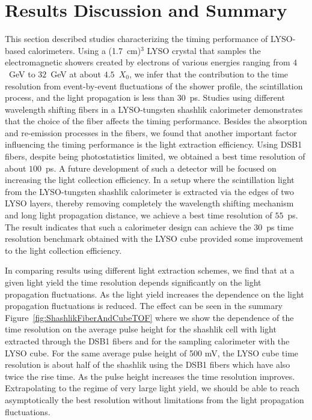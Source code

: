 \section{Results Discussion and Summary }
This section described studies characterizing the timing performance
of LYSO-based calorimeters. Using a (1.7~cm)$^{3}$ LYSO crystal that
samples the electromagnetic showers created by electrons of various energies
ranging from $4$~GeV to $32$~GeV at about $4.5$~$X_{0}$, we infer that the
contribution to the time resolution from event-by-event fluctuations of the
shower profile, the scintillation process, and the light propagation is less than
$30$~ps. Studies using different wavelength shifting fibers in a LYSO-tungsten shashlik calorimeter 
demonstrates that the choice of the fiber affects the timing performance. Besides the absorption 
and re-emission processes in the fibers, we found that another important factor influencing
the timing performance is the light extraction efficiency. Using DSB1 fibers, despite being 
photostatistics limited, we obtained a best time resolution of about $100$~ps.  A future 
development of such a detector will  be focused on increasing the light collection efficiency.
In a setup where  the scintillation light from the LYSO-tungsten
shashlik calorimeter is extracted via the edges of two LYSO layers, thereby
removing completely the wavelength shifting mechanism and long light propagation distance, 
we achieve a best time resolution of $55$~ps. The result  indicates  that such a
calorimeter design can achieve the $30$~ps time resolution benchmark obtained with the LYSO cube
provided some improvement to the light collection efficiency. 

In comparing results using different light extraction schemes, we find that at a
given light yield the time resolution depends significantly on the light
propagation fluctuations. As the light yield increases the dependence on the
light propagation fluctuations is reduced. The effect can be seen in the summary
Figure~\ref{fig:ShashlikFiberAndCubeTOF} where we show the dependence of the
time resolution on the average pulse height for the shashlik cell with light
extracted through the DSB1 fibers and for the sampling calorimeter with the LYSO
cube. For the same average pulse height of 500 mV, the LYSO cube time resolution
is about half of the shashlik using the DSB1 fibers which have also twice the
rise time. As the pulse height increases the time resolution improves.
Extrapolating to the regime of very large light yield, we should be able to
reach asymptotically the best resolution without limitations from the light
propagation fluctuations. 



